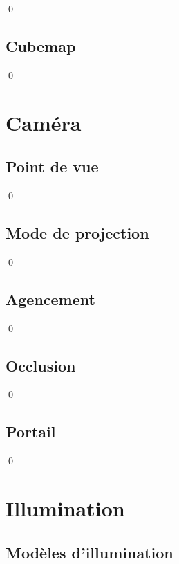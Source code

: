 \documentclass[12pt]{article}
\newcommand{\state}{\noindent}
\begin{document}
\state

\qed

\subsection{Cubemap}

\state

\qed

\pagebreak

\section{Caméra}

\subsection{Point de vue}

\state

\qed

\subsection{Mode de projection}

\state

\qed

\subsection{Agencement}

\state

\qed

\subsection{Occlusion}

\state

\qed

\subsection{Portail}

\state

\qed

\pagebreak


\section{Illumination}

\subsection{Modèles d'illumination}
\end{document}
